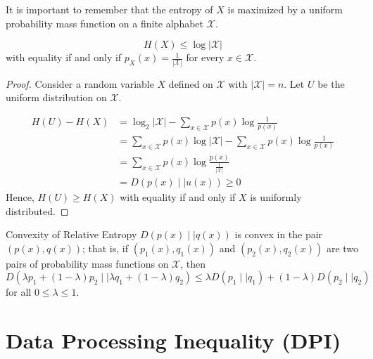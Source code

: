 It is important to remember that the entropy of \(X\) is maximized by a uniform probability mass function on a finite alphabet \(\mathcal{X} \).
\begin{thrm}{}{}
\[
    H(X) \leq \log \left\lvert \mathcal{X}  \right\rvert 
\]
with equality if and only if \(p_{X} (x) = \frac{1}{\left\lvert \mathcal{X}  \right\rvert }\) for every \(x \in \mathcal{X} \). 
\tcbline


\begin{proof}
Consider a random variable \(X\) defined on \(\mathcal{X} \) with \(\left\lvert \mathcal{X}  \right\rvert  = n\). Let \(U\) be the uniform distribution on \(\mathcal{X} \).

\begin{align*}
    H(U) - H(X) &=  \log _2 \left\lvert \mathcal{X}  \right\rvert  - \sum_{x \in \mathcal{X} } p(x) \log \frac{1}{p(x)} \\ &=  \sum_{x \in \mathcal{X} } p(x)\log \left\lvert \mathcal{X}  \right\rvert  - \sum_{x \in \mathcal{X} }p(x)\log \frac{1}{p(x)} \\
    &= \sum_{x\in \mathcal{X} } p(x)\log \frac{p(x)}{\frac{1}{\left\lvert \mathcal{X}  \right\rvert }} \\
    &= D(p(x) \mid \mid  u(x)) \geq 0
\end{align*}
Hence, \(H(U) \geq H(X)\) with equality if and only if \(X\) is uniformly distributed. 
\end{proof}
\end{thrm}


\begin{thrm}{Convexity of Relative Entropy}{}
\(D(p(x) \mid \mid q(x))\) is convex in the pair \((p(x), q(x))\); that is, if \((p_1(x),q_1(x))\) and \((p_2(x),q_2(x))\) are two pairs of probability mass functions on \(\mathcal{X} \), then
\[
    D(\lambda p_1 + (1 -\lambda )p_2 \mid \mid  \lambda q_1 + (1 -\lambda )q_2) \leq \lambda D(p _1 \mid \mid q_1) + (1 -\lambda )D(p_2 \mid \mid q_2)
\]
for all \(0\leq \lambda \leq 1\).  
\end{thrm}

\newpage

\section{Data Processing Inequality (DPI)}

